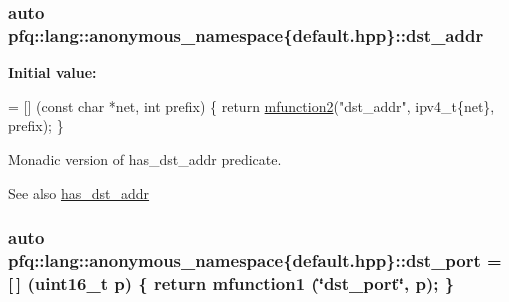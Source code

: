 \hypertarget{namespacepfq_1_1lang_1_1anonymous__namespace_02default_8hpp_03_a3f51de44baa33ff19a94995945636072}{
\subsubsection[{dst\+\_\+addr}]{\setlength{\rightskip}{0pt plus 5cm}auto pfq\+::lang\+::anonymous\+\_\+namespace\{default.\+hpp\}\+::dst\+\_\+addr}}\label{namespacepfq_1_1lang_1_1anonymous__namespace_02default_8hpp_03_a3f51de44baa33ff19a94995945636072}
{\bfseries Initial value\+:}
\begin{DoxyCode}
= [] (\textcolor{keyword}{const} \textcolor{keywordtype}{char} *net, \textcolor{keywordtype}{int} prefix)
        \{
            \textcolor{keywordflow}{return} \hyperlink{namespacepfq_1_1lang_aab1a000712bb2711044255ca1626cc84}{mfunction2}(\textcolor{stringliteral}{"dst\_addr"}, ipv4\_t\{net\}, prefix);
        \}
\end{DoxyCode}


Monadic version of {\ttfamily has\+\_\+dst\+\_\+addr} predicate. 

\begin{DoxySeeAlso}{See also}
\hyperlink{namespacepfq_1_1lang_1_1anonymous__namespace_02default_8hpp_03_a0a53822af0ed8ea341f16a1da5ea83e3}{has\+\_\+dst\+\_\+addr} 
\end{DoxySeeAlso}
\hypertarget{namespacepfq_1_1lang_1_1anonymous__namespace_02default_8hpp_03_a25a3b35caf255c109a6c5b4f601b1b61}{
\subsubsection[{dst\+\_\+port}]{\setlength{\rightskip}{0pt plus 5cm}auto pfq\+::lang\+::anonymous\+\_\+namespace\{default.\+hpp\}\+::dst\+\_\+port = \mbox{[}$\,$\mbox{]} (uint16\+\_\+t p) \{ return {\bf mfunction1} (\char`\"{}dst\+\_\+port\char`\"{}, p); \}}}\label{namespacepfq_1_1lang_1_1anonymous__namespace_02default_8hpp_03_a25a3b35caf255c109a6c5b4f601b1b61}


